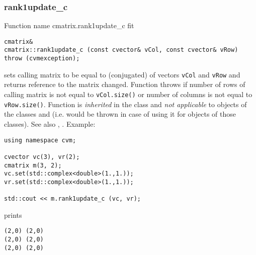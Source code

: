 \subsubsection{rank1update\_c}
Function%
\pdfdest name {cmatrix.rank1update_c} fit
\begin{verbatim}
cmatrix&
cmatrix::rank1update_c (const cvector& vCol, const cvector& vRow)
throw (cvmexception);
\end{verbatim}
sets calling matrix to be equal to 
 (conjugated) of vectors
\verb"vCol" and \verb"vRow"
and returns  reference to
the matrix changed.
Function throws  
if number of rows of  calling matrix
is not equal to \verb"vCol.size()"
or number of columns is not equal to \verb"vRow.size()".
Function is \emph{inherited} in the class
 and
\emph{not applicable} to objects of the classes
 and
 (i.e. 
 would be thrown
in case of using it for objects of those classes).
See also ,
.
Example:
\begin{Verbatim}
using namespace cvm;

cvector vc(3), vr(2);
cmatrix m(3, 2);
vc.set(std::complex<double>(1.,1.));
vr.set(std::complex<double>(1.,1.));

std::cout << m.rank1update_c (vc, vr);
\end{Verbatim}
prints
\begin{Verbatim}
(2,0) (2,0)
(2,0) (2,0)
(2,0) (2,0)
\end{Verbatim}
\newpage



